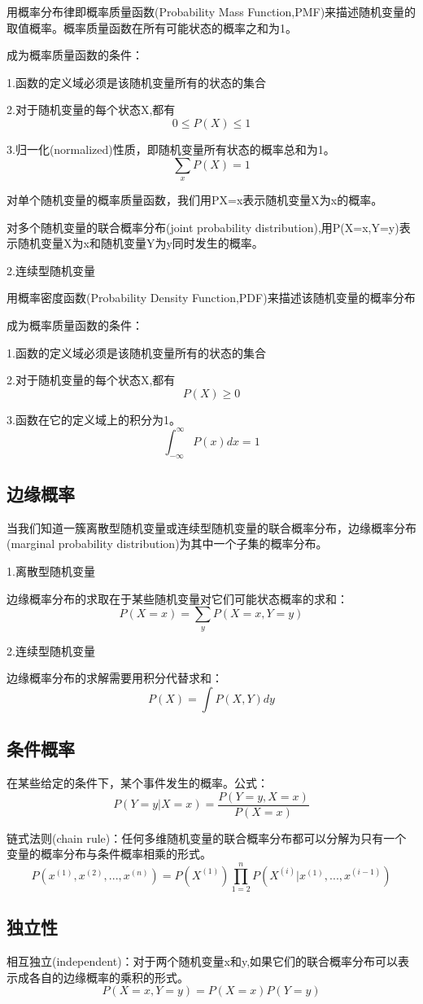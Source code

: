 \documentclass[openbib]{article}
\begin{document}
用概率分布律即概率质量函数(Probability Mass Function,PMF)来描述随机变量的取值概率。概率质量函数在所有可能状态的概率之和为1。

成为概率质量函数的条件：

1.函数的定义域必须是该随机变量所有的状态的集合

2.对于随机变量的每个状态X,都有$$0\le P(X)\le 1$$

3.归一化(normalized)性质，即随机变量所有状态的概率总和为1。
$$\sum_xP(X)=1$$

对单个随机变量的概率质量函数，我们用P{X=x}表示随机变量X为x的概率。

对多个随机变量的联合概率分布(joint probability distribution),用P(X=x,Y=y)表示随机变量X为x和随机变量Y为y同时发生的概率。
\begin{center}
	2.连续型随机变量
\end{center}

用概率密度函数(Probability Density Function,PDF)来描述该随机变量的概率分布

成为概率质量函数的条件：

1.函数的定义域必须是该随机变量所有的状态的集合

2.对于随机变量的每个状态X,都有$$P(X)\ge 0$$

3.函数在它的定义域上的积分为1。
$$\int_{-\infty}^{\infty}P(x)dx=1$$
\subsection{边缘概率}
当我们知道一簇离散型随机变量或连续型随机变量的联合概率分布，边缘概率分布(marginal probability distribution)为其中一个子集的概率分布。
\begin{center}
	1.离散型随机变量
\end{center}
边缘概率分布的求取在于某些随机变量对它们可能状态概率的求和：$$P(X=x)=\sum_{y}P(X=x,Y=y)$$
\begin{center}
	2.连续型随机变量
\end{center}
边缘概率分布的求解需要用积分代替求和：$$P(X)=\int P(X,Y)dy$$
\subsection{条件概率}
在某些给定的条件下，某个事件发生的概率。公式：
$$P(Y=y|X=x)=\frac{P(Y=y,X=x)}{P(X=x)}$$

链式法则(chain rule)：任何多维随机变量的联合概率分布都可以分解为只有一个变量的概率分布与条件概率相乘的形式。
$$P(x^{(1)},x^{(2)},...,x^{(n)})=P(X^{(1)})\prod_{1=2}^{n}P(X^{(i)}|x^{(1)},...,x^{(i-1)})$$
\subsection{独立性}
相互独立(independent)：对于两个随机变量x和y,如果它们的联合概率分布可以表示成各自的边缘概率的乘积的形式。
$$P(X=x,Y=y)=P(X=x)P(Y=y)$$
\end{document}
